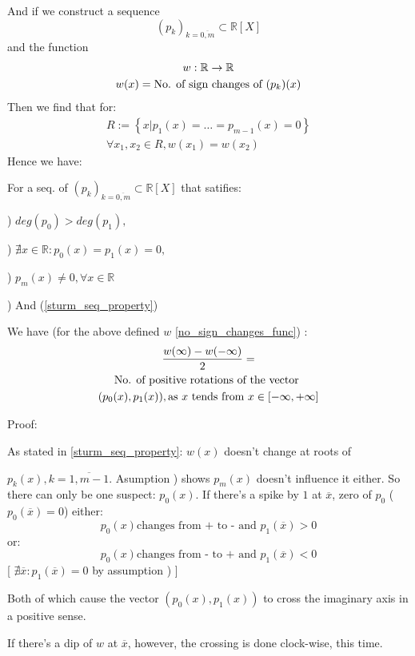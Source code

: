 And if we construct a sequence
\[
  (p_k)_{k = \overline{0,m}} \subset \mathbb{R}[X]
\]
and the function
\begin{gather}\label{no_sign_changes_func}
  w : \mathbb{R} \rightarrow \mathbb{R} \notag  \\
  w(x) = \text{No. of sign changes of  } (p_k)(x) \notag
\end{gather}
Then we find that for:
\begin{gather*}
  R := \left\{ x | p_1(x) = \dots = p_{m-1}(x) = 0  \right\} \\
  \forall x_1, x_2 \in R, w(x_1) = w(x_2)
\end{gather*}
Hence we have:
\begin{lemma}
  For a seq. of $  (p_k)_{k = \overline{0,m}} \subset \mathbb{R}[X]$ that satifies:

)
$ deg(p_0) > deg(p_1), $

)
$\nexists x \in \mathbb{R} : p_0(x) = p_1(x) = 0, $

)
$p_m(x) \neq 0, \forall x \in \mathbb{R}$

)
And (\ref{sturm_seq_property})
\par
We have (for the above defined $w$ \ref{no_sign_changes_func}) :
\begin{gather}
\frac{w(\infty) - w(-\infty)}{2} =  \notag \\
\text{No. of positive rotations of the vector } \notag \\
(p_0(x), p_1(x)), \text{as $x$ tends from  } x \in [-\infty, +\infty] \notag
\end{gather}
\end{lemma}

Proof:

As stated in \ref{sturm_seq_property}: $w(x)$ doesn't change at roots of

$p_k(x), k = \overline{1,m-1}$. Asumption ) shows $p_m(x)$ doesn't influence it either. So there can only be one suspect: $p_0(x)$. If there's a spike by $1$ at $\overline{x}$, zero of $p_0$ (   $p_0(\overline{x}) =0 $) either:
\[
p_0(x) \text{changes from + to - and   } p_1(\overline{x}) > 0
\]
or:
\[
p_0(x) \text{changes from - to + and  } p_1(\overline{x}) < 0
\]
[   $\nexists \overline{x}: p_1(\overline{x}) = 0$ by assumption )  ]

Both of which cause the vector $(p_0(x), p_1(x))$ to cross the imaginary axis in a positive sense.

If there's a dip of $w$ at $\overline{x}$, however, the crossing is done clock-wise, this time.

